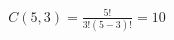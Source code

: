 \documentclass[preview]{standalone}
\begin{document}
\begin{align*}
C(5,3) = \frac{5!}{3!(5-3)!} = 10
\end{align*}
\end{document}
